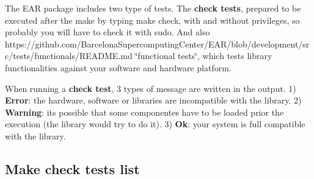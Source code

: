 The E\+AR package includes two type of tests. The {\bfseries check tests}, prepared to be executed after the {\ttfamily make} by typing {\ttfamily make check}, with and without privileges, so probably you will have to check it with {\ttfamily sudo}. And also https\+://github.com/\+Barcelona\+Supercomputing\+Center/\+E\+A\+R/blob/development/src/tests/functionals/\+R\+E\+A\+D\+M\+E.\+md \char`\"{}functional tests\char`\"{}, which tests library functionalities against your software and hardware platform.

When running a {\bfseries check test}, 3 types of message are written in the output. 1) {\bfseries Error}\+: the hardware, software or libraries are incompatible with the library. 2) {\bfseries Warning}\+: it\textquotesingle{}s possible that some componentes have to be loaded prior the execution (the library would try to do it). 3) {\bfseries Ok}\+: your system is full compatible with the library.

\subsection*{Make check tests list }

